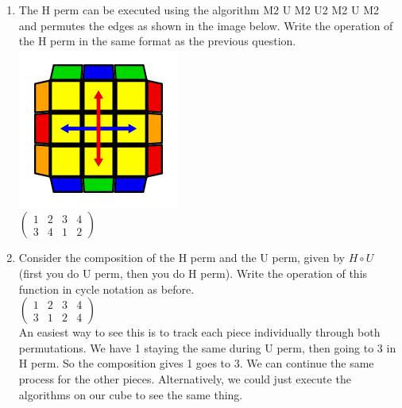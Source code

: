 \documentclass[11pt]{article}
\begin{document}
\begin{enumerate}
    \item The H perm can be executed using the algorithm M2 U M2 U2 M2 U M2 and permutes the edges as shown in the image below. Write the operation of the H perm in the same format as the previous question. \\
    \includegraphics[scale=0.3]{hperm.png}\\
    $\begin{pmatrix}
    1 & 2 & 3 & 4\\
    3 & 4 & 1 & 2
    \end{pmatrix}$
    
    \item Consider the composition of the H perm and the U perm, given by $H\circ U$ (first you do U perm, then you do H perm). Write the operation of this function in cycle notation as before. \\
    $\begin{pmatrix}
    1 & 2 & 3 & 4\\
    3 & 1 & 2 & 4
    \end{pmatrix}$\\
    An easiest way to see this is to track each piece individually through both permutations. We have 1 staying the same during U perm, then going to 3 in H perm. So the composition gives 1 goes to 3. We can continue the same process for the other pieces. Alternatively, we could just execute the algorithms on our cube to see the same thing.
\end{enumerate}

\newpage
\end{document}
